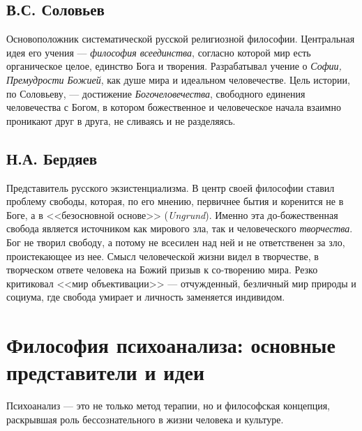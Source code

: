 \documentclass[12pt,a4paper]{article}
\begin{document}
	\subsection{В.С. Соловьев}
	Основоположник систематической русской религиозной философии. Центральная идея его учения — \textit{философия всеединства}, согласно которой мир есть органическое целое, единство Бога и творения. Разрабатывал учение о \textit{Софии, Премудрости Божией}, как душе мира и идеальном человечестве. Цель истории, по Соловьеву, — достижение \textit{Богочеловечества}, свободного единения человечества с Богом, в котором божественное и человеческое начала взаимно проникают друг в друга, не сливаясь и не разделяясь.
	
	\subsection{Н.А. Бердяев}
	Представитель русского экзистенциализма.
	В центр своей философии ставил проблему свободы, которая, по его мнению, первичнее бытия и коренится не в Боге, а в <<безосновной основе>> (\textit{Ungrund}). Именно эта до-божественная свобода является источником как мирового зла, так и человеческого \textit{творчества}. Бог не творил свободу, а потому не всесилен над ней и не ответственен за зло, проистекающее из нее. Смысл человеческой жизни видел в творчестве, в творческом ответе человека на Божий призыв к со-творению мира. Резко критиковал <<мир объективации>> — отчужденный, безличный мир природы и социума, где свобода умирает и личность заменяется индивидом.
	
	\section{Философия психоанализа: основные представители и идеи~\checkmark}
	
	Психоанализ — это не только метод терапии, но и философская концепция, раскрывшая роль бессознательного в жизни человека и культуре.
	
\end{document}
